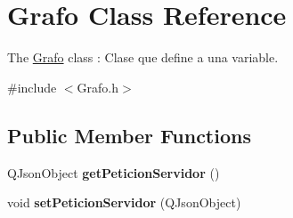 \hypertarget{class_grafo}{}\section{Grafo Class Reference}
\label{class_grafo}


The \hyperlink{class_grafo}{Grafo} class \+: Clase que define a una variable.  




{\ttfamily \#include $<$Grafo.\+h$>$}

\subsection*{Public Member Functions}
\begin{DoxyCompactItemize}
\item 
Q\+Json\+Object {\bfseries get\+Peticion\+Servidor} ()\hypertarget{class_grafo_a5f2683c70d54f0b7420ceeebc4fc5c69}{}\label{class_grafo_a5f2683c70d54f0b7420ceeebc4fc5c69}

\item 
void {\bfseries set\+Peticion\+Servidor} (Q\+Json\+Object)\hypertarget{class_grafo_ae94daf3bf738b869a662c6d054ff3a3c}{}\label{class_grafo_ae94daf3bf738b869a662c6d054ff3a3c}


\end{DoxyCompactItemize}
